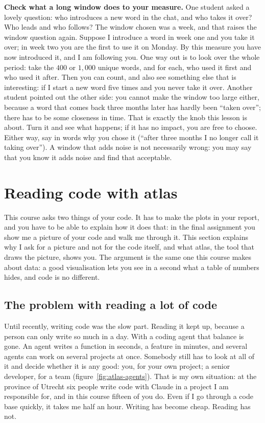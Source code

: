 \documentclass[12pt, a4paper]{article}
\theoremstyle{definition}
\theoremstyle{remark}
\begin{document}
\textbf{Check what a long window does to your measure.} One student asked a lovely question: who introduces a new word in the chat, and who takes it over? Who leads and who follows? The window chosen was a week, and that raises the window question again. Suppose I introduce a word in week one and you take it over; in week two you are the first to use it on Monday. By this measure you have now introduced it, and I am following you. One way out is to look over the whole period: take the $400$ or $1{,}000$ unique words, and for each, who used it first and who used it after. Then you can count, and also see something else that is interesting: if I start a new word five times and you never take it over. Another student pointed out the other side: you cannot make the window too large either, because a word that comes back three months later has hardly been ``taken over''; there has to be some closeness in time. That is exactly the knob this lesson is about. Turn it and see what happens; if it has no impact, you are free to choose. Either way, say in words why you chose it (``after three months I no longer call it taking over''). A window that adds noise is not necessarily wrong: you may say that you know it adds noise and find that acceptable.
\newpage

\section{Reading code with atlas}
\label{sec:atlas}
This course asks two things of your code. It has to make the plots in your report, and you have to be able to explain how it does that: in the final assignment you show me a picture of your code and walk me through it. This section explains why I ask for a picture and not for the code itself, and what atlas, the tool that draws the picture, shows you. The argument is the same one this course makes about data: a good visualisation lets you see in a second what a table of numbers hides, and code is no different.

\subsection{The problem with reading a lot of code}
\label{sec:atlas-reading}
Until recently, writing code was the slow part. Reading it kept up, because a person can only write so much in a day. With a coding agent that balance is gone. An agent writes a function in seconds, a feature in minutes, and several agents can work on several projects at once. Somebody still has to look at all of it and decide whether it is any good: you, for your own project; a senior developer, for a team (figure~\ref{fig:atlas-agents}). That is my own situation: at the province of Utrecht six people write code with Claude in a project I am responsible for, and in this course fifteen of you do. Even if I go through a code base quickly, it takes me half an hour. Writing has become cheap. Reading has not.
\end{document}
